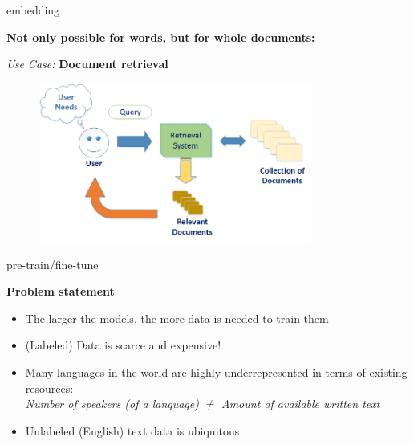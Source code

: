 
\begin{frame}{embedding}
	
\vfill

\textbf{Not only possible for words, but for whole documents:}\\

\vspace{.5cm}

\textit{Use Case:} \textbf{Document retrieval}

\begin{figure}
	\centering
		\includegraphics[width = 9cm]{figure/retrieval.png}\\ 
\end{figure}

\vfill

	
\end{frame}


\begin{frame}{pre-train/fine-tune}

\vfill

\textbf{Problem statement}

\begin{itemize}
	\item The larger the models, the more data is needed to train them
	\item (Labeled) Data is scarce and expensive!
	\item Many languages in the world are highly underrepresented in terms of existing resources:\\
				\textit{Number of speakers (of a language)} $\neq$ \textit{Amount of available written text}
	\item Unlabeled (English) text data is ubiquitous
\end{itemize}
	
\vfill

\end{frame}

